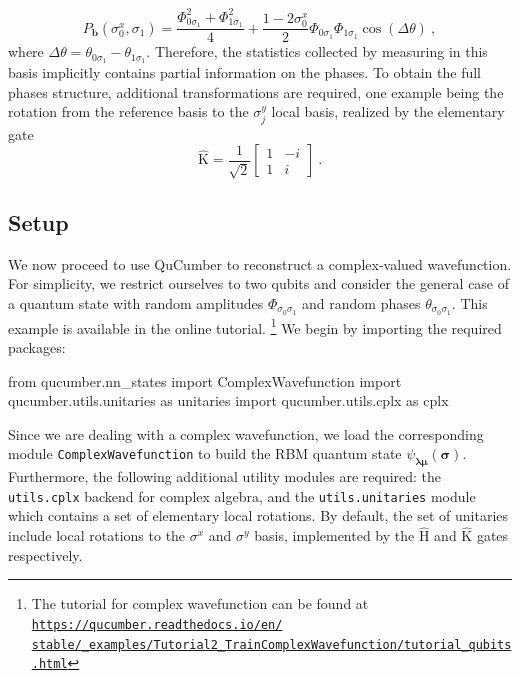 \documentclass[submission, Phys, hidelnks]{SciPost}
\begin{document}
\begin{equation}
    P_{\bm{b}}(\sigma_0^x,\sigma_1)=\frac{\Phi_{0\sigma_1}^2+\Phi_{1\sigma_1}^2}{4}+\frac{1-2\sigma_0^x}{2}\Phi_{0\sigma_1}\Phi_{1\sigma_1}\cos(\Delta\theta)\:,
\end{equation}
where $\Delta\theta=\theta_{0\sigma_1}-\theta_{1\sigma_1}$. Therefore, the statistics collected by measuring in this basis implicitly contains partial information on the phases. To obtain the full phases structure, additional transformations are required, one example being the rotation from the reference basis to the $\sigma^y_j$ local basis, realized by
the elementary gate
\begin{equation}
        \hat{\mathrm{K}}=\frac{1}{\sqrt{2}}\begin{bmatrix}1 & -i\\
    1 & i
\end{bmatrix}\:.
\end{equation}


\subsection{Setup}
We now proceed to use QuCumber to reconstruct a complex-valued wavefunction. For simplicity, we restrict ourselves to two qubits and consider the general case of a quantum state with random amplitudes $\Phi_{\sigma_0\sigma_1}$ and random phases $\theta_{\sigma_0\sigma_1}$. This example is available in the online tutorial.
\footnote{The tutorial for complex wavefunction can be found at
    \href{https://qucumber.readthedocs.io/en/stable/\_examples/Tutorial2_TrainComplexWavefunction/tutorial_qubits.html
    }{\texttt{https://qucumber.readthedocs.io/en/\\stable/\_examples/Tutorial2\_TrainComplexWavefunction/tutorial\_qubits.html}}
}
We begin by importing the required packages:

\begin{python}
from qucumber.nn_states import ComplexWavefunction
import qucumber.utils.unitaries as unitaries
import qucumber.utils.cplx as cplx
\end{python}
Since we are dealing with a complex wavefunction, we load the corresponding module 
\verb|ComplexWavefunction| to build the RBM quantum state $\psi_{\bm{\lambda\mu}}(\bm{\sigma})$. Furthermore, the following additional utility modules are required: the \verb|utils.cplx| backend for complex algebra, 
and the \verb|utils.unitaries| module  which contains a set of elementary local rotations. By default, the set of unitaries include local rotations to the $\sigma^x$ and $\sigma^y$ basis, implemented by the $\hat{\mathrm{H}}$ and $\hat{\mathrm{K}}$ gates respectively.
\end{document}
